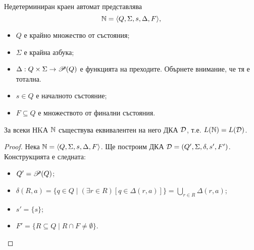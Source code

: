 \begin{dfn}
  Недетерминиран краен автомат представлява
  \[\mathbb{N} = \langle{Q,\Sigma,s,\Delta,F}\rangle,\]
  \begin{itemize}
  \item
    $Q$ е крайно множество от състояния;
  \item
    $\Sigma$ е крайна азбука;
  \item
    $\Delta: Q\times\Sigma \to \mathscr{P}(Q)$ е функцията на преходите.
    Обърнете внимание, че тя е тотална.
  \item
    $s \in Q$ е началното състояние;
  \item
    $F\subseteq Q$ е множеството от финални състояния.
  \end{itemize}
\end{dfn}

\begin{thm}
  За всеки НKА $\mathbb{N}$ съществува еквивалентен на него ДКА $\mathcal{D}$, т.е. $L(\mathbb{N}) = L(\mathcal{D})$.
\end{thm}
\begin{proof}
  Нека $\mathbb{N} = \langle{Q,\Sigma,s,\Delta,F}\rangle$. Ще построим ДКА $\mathcal{D} = (Q',\Sigma,\delta,s',F')$.
  Конструкцията е следната:
  \begin{itemize}
  \item
    $Q' = \mathscr{P}(Q)$;
  \item
    $\delta(R,a) = \{q\in Q\mid (\exists r\in R)[q\in\Delta(r,a)]\} = \bigcup_{r\in R}\Delta(r,a)$;
  \item
    $s' = \{s\}$;
  \item
    $F' = \{R \subseteq Q \mid R\cap F \neq \emptyset\}$.
  \end{itemize}
\end{proof}

